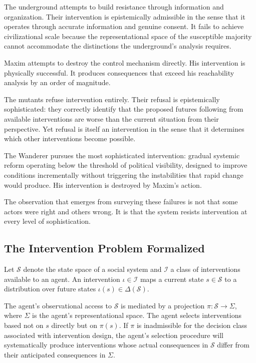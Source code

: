 \documentclass[12pt, a4paper]{article}
\theoremstyle{plain}
\theoremstyle{definition}
\theoremstyle{remark}
\begin{document}
The underground attempts to build resistance
through information and organization. Their
intervention is epistemically admissible in the
sense that it operates through accurate information
and genuine consent. It fails to achieve
civilizational scale because the representational
space of the susceptible majority cannot
accommodate the distinctions the underground's
analysis requires.

Maxim attempts to destroy the control mechanism
directly. His intervention is physically
successful. It produces consequences that exceed
his reachability analysis by an order of magnitude.

The mutants refuse intervention entirely. Their
refusal is epistemically sophisticated: they
correctly identify that the proposed futures
following from available interventions are worse
than the current situation from their perspective.
Yet refusal is itself an intervention in the sense
that it determines which other interventions
become possible.

The Wanderer pursues the most sophisticated
intervention: gradual systemic reform operating
below the threshold of political visibility,
designed to improve conditions incrementally
without triggering the instabilities that rapid
change would produce. His intervention is
destroyed by Maxim's action.

The observation that emerges from surveying these
failures is not that some actors were right and
others wrong. It is that the system resists
intervention at every level of sophistication.

\subsection{The Intervention Problem Formalized}

Let $\mathcal{S}$ denote the state space of a
social system and $\mathcal{I}$ a class of
interventions available to an agent. An
intervention $\iota \in \mathcal{I}$ maps a
current state $s \in \mathcal{S}$ to a
distribution over future states
$\iota(s) \in \Delta(\mathcal{S})$.

The agent's observational access to $\mathcal{S}$
is mediated by a projection $\pi: \mathcal{S}
\to \Sigma$, where $\Sigma$ is the agent's
representational space. The agent selects
interventions based not on $s$ directly but on
$\pi(s)$. If $\pi$ is inadmissible for the
decision class associated with intervention
design, the agent's selection procedure will
systematically produce interventions whose actual
consequences in $\mathcal{S}$ differ from their
anticipated consequences in $\Sigma$.
\end{document}
